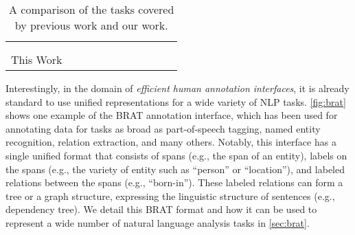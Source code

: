 \documentclass[11pt,a4paper]{article}
\newcommand{\cmark}{\ding{51}}
\newcommand{\xmark}{\textcolor{lightgray}{\ding{55}}}
\begin{document}
\begin{table*}[tb]
{\begin{tabular}{ccccccccccc}
\citet{marasovic-frank-2018-srl4orl} & \xmark & \xmark & \xmark & \xmark & \xmark & \xmark & \xmark & \cmark & \xmark & \cmark \\
\citet{hashimoto:17:mtlsocher} & \xmark & \xmark & \xmark & \xmark & \cmark & \cmark & \xmark & \xmark & \xmark & \xmark \\
 This Work & \cmark & \cmark & \cmark & \cmark & \cmark & \cmark & \cmark & \cmark & \cmark & \cmark \\
\bottomrule
\end{tabular}
}
\caption{A comparison of the tasks covered by previous work and our work.
}
\vspace{-3mm}
\label{tab:related_work}
\end{table*}

Interestingly, in the domain of \emph{efficient human annotation interfaces}, it is already standard to use unified representations for a wide variety of NLP tasks.
\autoref{fig:brat} shows one example of the BRAT \citep{stenetorp-etal-2012-brat} annotation interface, which has been used for annotating data for tasks as broad as part-of-speech tagging, named entity recognition, relation extraction, and many others.
Notably, this interface has a single unified format that consists of spans (e.g., the span of an entity), labels on the spans (e.g., the variety of entity such as ``person'' or ``location''), and labeled relations between the spans (e.g., ``born-in'').
These labeled relations can form a tree or a graph structure, expressing the linguistic structure of sentences (e.g., dependency tree). 
We detail this BRAT format and how it can be used to represent a wide number of natural language analysis tasks in \autoref{sec:brat}. 
\end{document}
